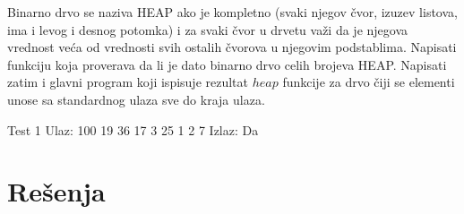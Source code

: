 \begin{Exercise}[label=715]
Binarno drvo se naziva HEAP ako je kompletno (svaki njegov čvor, izuzev listova, ima i levog i desnog potomka) i za svaki čvor u drvetu važi da je njegova vrednost veća od vrednosti svih ostalih čvorova u njegovim podstablima. Napisati funkciju  koja proverava da li je dato binarno drvo celih brojeva HEAP. Napisati zatim i glavni program koji ispisuje rezultat $heap$ funkcije za drvo čiji se elementi unose sa standardnog ulaza sve do kraja ulaza.

\begin{miditest}
\begin{test}{Test 1}
Ulaz: 
100 19 36 17 3 25 1 2 7
Izlaz: 
Da
\end{test}
\end{miditest}

\end{Exercise}


\section{Rešenja}
\shipoutAnswer
